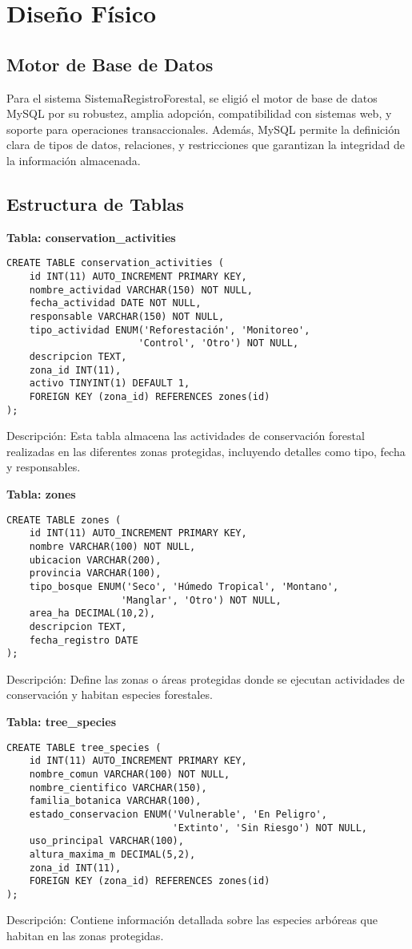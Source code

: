 \section{Diseño Físico}
\subsection{Motor de Base de Datos}
Para el sistema SistemaRegistroForestal, se eligió el motor de base de datos MySQL por su robustez, amplia adopción, compatibilidad con sistemas web, y soporte para operaciones transaccionales. Además, MySQL permite la definición clara de tipos de datos, relaciones, y restricciones que garantizan la integridad de la información almacenada.

\subsection{Estructura de Tablas}
\textbf{Tabla: conservation\_activities}
\begin{verbatim}
CREATE TABLE conservation_activities (
    id INT(11) AUTO_INCREMENT PRIMARY KEY,
    nombre_actividad VARCHAR(150) NOT NULL,
    fecha_actividad DATE NOT NULL,
    responsable VARCHAR(150) NOT NULL,
    tipo_actividad ENUM('Reforestación', 'Monitoreo', 
                       'Control', 'Otro') NOT NULL,
    descripcion TEXT,
    zona_id INT(11),
    activo TINYINT(1) DEFAULT 1,
    FOREIGN KEY (zona_id) REFERENCES zones(id)
);
\end{verbatim}
Descripción: Esta tabla almacena las actividades de conservación forestal realizadas en las diferentes zonas protegidas, incluyendo detalles como tipo, fecha y responsables.

\textbf{Tabla: zones}
\begin{verbatim}
CREATE TABLE zones (
    id INT(11) AUTO_INCREMENT PRIMARY KEY,
    nombre VARCHAR(100) NOT NULL,
    ubicacion VARCHAR(200),
    provincia VARCHAR(100),
    tipo_bosque ENUM('Seco', 'Húmedo Tropical', 'Montano', 
                    'Manglar', 'Otro') NOT NULL,
    area_ha DECIMAL(10,2),
    descripcion TEXT,
    fecha_registro DATE
);
\end{verbatim}
Descripción: Define las zonas o áreas protegidas donde se ejecutan actividades de conservación y habitan especies forestales.

\textbf{Tabla: tree\_species}
\begin{verbatim}
CREATE TABLE tree_species (
    id INT(11) AUTO_INCREMENT PRIMARY KEY,
    nombre_comun VARCHAR(100) NOT NULL,
    nombre_cientifico VARCHAR(150),
    familia_botanica VARCHAR(100),
    estado_conservacion ENUM('Vulnerable', 'En Peligro', 
                             'Extinto', 'Sin Riesgo') NOT NULL,
    uso_principal VARCHAR(100),
    altura_maxima_m DECIMAL(5,2),
    zona_id INT(11),
    FOREIGN KEY (zona_id) REFERENCES zones(id)
);
\end{verbatim}
Descripción: Contiene información detallada sobre las especies arbóreas que habitan en las zonas protegidas.

